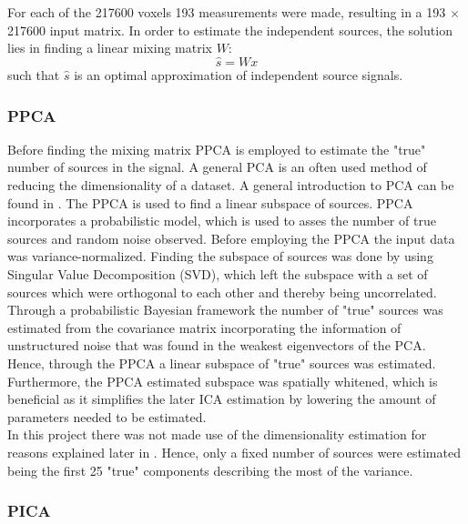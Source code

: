 For each of the 217600 voxels 193 measurements were made, resulting in a 193 $\times$ 217600 input matrix. In order to estimate the independent sources, the solution lies in finding a linear mixing matrix $W$:
\begin{equation}
\widehat{s}= Wx
\end{equation}  
such that $\widehat{s}$ is an optimal approximation of independent source signals. 
\subsubsection{PPCA}

Before finding the mixing matrix PPCA is employed to estimate the "true" number of sources in the signal. A general PCA is an often used method of reducing the dimensionality of a dataset. A general introduction to PCA can be found in . The PPCA is used to find a linear subspace of sources. PPCA incorporates a probabilistic model, which is used to asses the number of true sources and random noise observed. Before employing the PPCA the input data was variance-normalized. Finding the subspace of sources was done by using Singular Value Decomposition (SVD), which left the subspace with a set of sources which were orthogonal to each other and thereby being uncorrelated. Through a probabilistic Bayesian framework the number of "true" sources was estimated from the covariance matrix incorporating the information of unstructured noise that was found in the weakest eigenvectors of the PCA. Hence, through the PPCA a linear subspace of "true" sources was estimated. Furthermore, the PPCA estimated subspace was spatially whitened, which is beneficial as it simplifies the later ICA estimation by lowering the amount of parameters needed to be estimated.  \\
In this project there was not made use of the dimensionality estimation for reasons explained later in . Hence, only a fixed number of sources were estimated being the first 25 "true" components describing the most of the variance.

\subsubsection{PICA}

